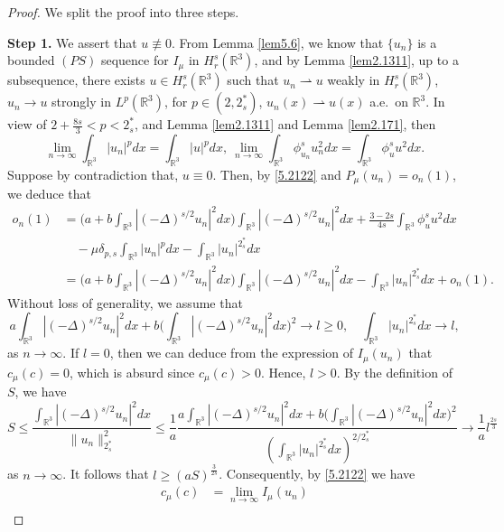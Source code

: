 \begin{proof}  We split the proof into three steps.
\smallskip

\noindent\textbf{Step 1.} 
We assert that  $u\not\equiv 0$.
From Lemma {\ref{lem5.6}}, we  know that $\{u_n\}$ is a  bounded $(PS)$ sequence 
for $I_\mu$ in $H^s_r(\mathbb{R}^3)$, and by Lemma {\ref{lem2.1311}}, up to a 
subsequence, there exists $u\in H^s_r(\mathbb{R}^3)$ such that $u_n\rightharpoonup u$ 
weakly in $ H^s_r(\mathbb{R}^3)$, $u_n\to u$ strongly in $ L^p(\mathbb{R}^3)$, for 
$p\in (2, 2^*_s)$, $u_n(x)\rightharpoonup u(x)$ a.e.\ on $\mathbb{R}^3$. 
In view of $2+\frac{8s}{3}<p<2^*_s$, and Lemma {\ref{lem2.1311}} and  
Lemma {\ref{lem2.171}}, then
\begin{equation}\label{5.2122}
\lim_{n\to \infty}\int_{\mathbb{R}^3}|u_n|^pdx
=\int_{\mathbb{R}^3}|u|^pdx,~\lim_{n\to \infty}\int_{\mathbb{R}^3}
\phi^s_{u_n}u^2_ndx=\int_{\mathbb{R}^3}\phi^s_{u}u^2dx.
\end{equation}
Suppose by contradiction that, $u\equiv 0$. Then, by \eqref{5.2122} and 
$P_\mu(u_n)=o_n(1)$, we deduce that
\begin{align*}
o_n(1)&
= \Big(a+b\int_{\mathbb{R}^3}|(-\Delta)^{s/2}u_n|^2dx\Big)
 \int_{\mathbb{R}^3}|(-\Delta)^{s/2}u_n|^2dx
 +\frac{3-2s}{4s}\int_{\mathbb{R}^3}\phi^s_u u^2dx\\
&\quad -\mu \delta_{p,s}\int_{\mathbb{R}^3}|u_n|^pdx
 -\int_{\mathbb{R}^3}|u_n|^{2^*_s}dx\\
&= \Big(a+b\int_{\mathbb{R}^3}|(-\Delta)^{s/2}u_n|^2dx\Big)
 \int_{\mathbb{R}^3}|(-\Delta)^{s/2}u_n|^2dx
-\int_{\mathbb{R}^3}|u_n|^{2^*_s}dx+o_n(1).
\end{align*}
Without loss of generality, we assume that
$$
a\int_{\mathbb{R}^3}|(-\Delta)^{s/2}u_n|^2dx
+b\Big(\int_{\mathbb{R}^3}|(-\Delta)^{s/2}u_n|^2dx\Big)^2\to l\geq 0,\quad
\int_{\mathbb{R}^3}|u_n|^{2^*_s}dx\to l,
$$
as $n\to \infty$. If $l=0$, then we can deduce from the expression of $I_\mu(u_n)$ 
that $c_\mu(c)=0$, which is absurd since $c_\mu(c)>0$. Hence, $l>0$. 
By the definition of $S$, we have
$$
S\leq \frac{\int_{\mathbb{R}^3}|(-\Delta)^{s/2}u_n|^2dx}
{\|u_n\|^2_{2^*_s}}\leq \frac{1}{a}
\frac{a\int_{\mathbb{R}^3}|(-\Delta)^{s/2}u_n|^2dx
+b\Big(\int_{\mathbb{R}^3}|(-\Delta)^{s/2}u_n|^2dx\Big)^2}
{\left(\int_{\mathbb{R}^3}|u_n|^{2^*_s}
dx\right)^{2/2^*_s}}
\to \frac{1}{a}l^{\frac{2s}{3}}
$$
as $n\to \infty $. It follows that $l\geq (aS)^{\frac{3}{2s}}$. Consequently,
 by \eqref{5.2122} we have
\begin{align*}
c_\mu(c)
&= \lim_{n\to \infty}I_\mu(u_n)\\

\end{align*}
\end{proof}
